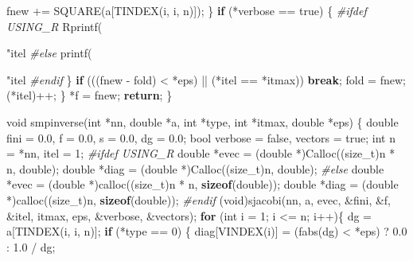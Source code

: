 \documentclass[12pt,]{article}
\newenvironment{Shaded}{\begin{snugshade}}{\end{snugshade}}
\newcommand{\ControlFlowTok}[1]{\textcolor[rgb]{0.13,0.29,0.53}{\textbf{#1}}}
\newcommand{\DataTypeTok}[1]{\textcolor[rgb]{0.13,0.29,0.53}{#1}}
\newcommand{\DecValTok}[1]{\textcolor[rgb]{0.00,0.00,0.81}{#1}}
\newcommand{\FloatTok}[1]{\textcolor[rgb]{0.00,0.00,0.81}{#1}}
\newcommand{\KeywordTok}[1]{\textcolor[rgb]{0.13,0.29,0.53}{\textbf{#1}}}
\newcommand{\NormalTok}[1]{#1}
\newcommand{\PreprocessorTok}[1]{\textcolor[rgb]{0.56,0.35,0.01}{\textit{#1}}}
\newcommand{\SpecialCharTok}[1]{\textcolor[rgb]{0.00,0.00,0.00}{#1}}
\newcommand{\StringTok}[1]{\textcolor[rgb]{0.31,0.60,0.02}{#1}}
\begin{document}
\begin{Shaded}
\begin{Highlighting}[]
{{{{{{{{\NormalTok{      fnew += SQUARE(a[TINDEX(i, i, n)]);}
\NormalTok{    \}}
    \ControlFlowTok{if}\NormalTok{ (*verbose == true) \{}
\PreprocessorTok{#ifdef USING_R}
\NormalTok{      Rprintf(}\StringTok{"itel %
\PreprocessorTok{#else}
\NormalTok{      printf(}\StringTok{"itel %
\PreprocessorTok{#endif}
\NormalTok{    \}}
    \ControlFlowTok{if}\NormalTok{ (((fnew - fold) < *eps) || (*itel == *itmax))}
      \ControlFlowTok{break}\NormalTok{;}
\NormalTok{    fold = fnew;}
\NormalTok{    (*itel)++;}
\NormalTok{  \}}
\NormalTok{  *f = fnew;}
  \ControlFlowTok{return}\NormalTok{;}
\NormalTok{\}}

\DataTypeTok{void}\NormalTok{ smpinverse(}\DataTypeTok{int}\NormalTok{ *nn, }\DataTypeTok{double}\NormalTok{ *a, }\DataTypeTok{int}\NormalTok{ *type, }\DataTypeTok{int}\NormalTok{ *itmax, }\DataTypeTok{double}\NormalTok{ *eps) \{}
  \DataTypeTok{double}\NormalTok{ fini = }\FloatTok{0.0}\NormalTok{, f = }\FloatTok{0.0}\NormalTok{, s = }\FloatTok{0.0}\NormalTok{, dg = }\FloatTok{0.0}\NormalTok{;}
  \DataTypeTok{bool}\NormalTok{ verbose = false, vectors = true;}
  \DataTypeTok{int}\NormalTok{ n = *nn, itel = }\DecValTok{1}\NormalTok{;}
\PreprocessorTok{#ifdef USING_R}
  \DataTypeTok{double}\NormalTok{ *evec = (}\DataTypeTok{double}\NormalTok{ *)Calloc((}\DataTypeTok{size_t}\NormalTok{)n * n, }\DataTypeTok{double}\NormalTok{);}
  \DataTypeTok{double}\NormalTok{ *diag = (}\DataTypeTok{double}\NormalTok{ *)Calloc((}\DataTypeTok{size_t}\NormalTok{)n, }\DataTypeTok{double}\NormalTok{);}
\PreprocessorTok{#else}
  \DataTypeTok{double}\NormalTok{ *evec = (}\DataTypeTok{double}\NormalTok{ *)calloc((}\DataTypeTok{size_t}\NormalTok{)n * n, }\KeywordTok{sizeof}\NormalTok{(}\DataTypeTok{double}\NormalTok{));}
  \DataTypeTok{double}\NormalTok{ *diag = (}\DataTypeTok{double}\NormalTok{ *)calloc((}\DataTypeTok{size_t}\NormalTok{)n, }\KeywordTok{sizeof}\NormalTok{(}\DataTypeTok{double}\NormalTok{));}
\PreprocessorTok{#endif}
\NormalTok{  (}\DataTypeTok{void}\NormalTok{)sjacobi(nn, a, evec, &fini, &f, &itel, itmax, eps, &verbose, &vectors);}
  \ControlFlowTok{for}\NormalTok{ (}\DataTypeTok{int}\NormalTok{ i = }\DecValTok{1}\NormalTok{; i <= n; i++)\{}
\NormalTok{    dg = a[TINDEX(i, i, n)];}
    \ControlFlowTok{if}\NormalTok{ (*type == }\DecValTok{0}\NormalTok{) \{}
\NormalTok{      diag[VINDEX(i)] = (fabs(dg) < *eps) ? }\FloatTok{0.0}\NormalTok{ : }\FloatTok{1.0}\NormalTok{ / dg;}
}}}}}}}}}}
\end{Highlighting}
\end{Shaded}
\end{document}
